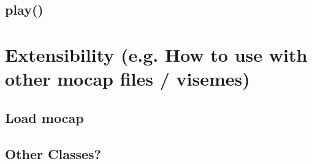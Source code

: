 \documentclass[a4paper,10pt]{scrartcl}
\let\stdsubsection\subsection
\renewcommand\subsection{\nopagebreak\stdsubsection}
\begin{document}
\subsection{play()}

\section{Extensibility (e.g. How to use with other mocap files / visemes)}

\subsection{Load mocap}

\subsection{Other Classes?}

%
\end{document}

